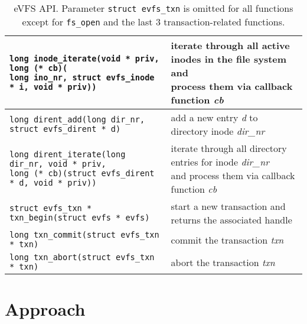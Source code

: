 \begin{table*}
\begin{centering}
\begin{small}
\begin{tabular}[t]{|l|l|}
\makecell[l]{\texttt{long inode\_iterate(void * priv, long (* cb)(} \\ 
\hspace{1em}\texttt{long ino\_nr, struct evfs\_inode * i, void * priv))}} & \makecell[l]{iterate through all active inodes in the file system and \\ process them via callback function \textit{cb}} \\
\hline
\hline
\texttt{long dirent\_add(long dir\_nr, struct evfs\_dirent * d)} & add a new entry \textit{d} to directory inode \textit{dir\_nr} \\
\hline 
\makecell[l]{\texttt{long dirent\_iterate(long dir\_nr, void * priv,} \\ 
\hspace{1em}\texttt{long (* cb)(struct evfs\_dirent * d, void * priv))}} & \makecell[l]{iterate through all directory entries for inode \textit{dir\_nr} \\ and process them via callback function \textit{cb}} \\
\hline
\hline
\texttt{struct evfs\_txn * txn\_begin(struct evfs * evfs)} & start a new transaction and returns the associated handle \\
\hline 
\texttt{long txn\_commit(struct evfs\_txn * txn)} & commit the transaction \textit{txn} \\
\hline 
\texttt{long txn\_abort(struct evfs\_txn * txn)} & abort the transaction \textit{txn} \\
\hline
\end{tabular}
\end{small}
\par\end{centering}
\vspace{-5pt}
\caption{\label{tab:evfs-api}eVFS API. Parameter \texttt{struct evfs\_txn} is omitted for all functions except for \texttt{fs\_open} and the last 3 transaction-related functions.}
\vspace{-6pt}
\end{table*}

\vspace{-0.5em}
\section{Approach\label{sec:Approach}}


